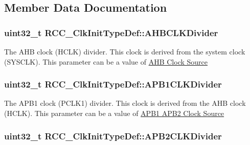 \subsection{Member Data Documentation}
\hypertarget{struct_r_c_c___clk_init_type_def_abd9bcaa8dcf4b816462ee2930ab3e993}{
\subsubsection[{A\-H\-B\-C\-L\-K\-Divider}]{\setlength{\rightskip}{0pt plus 5cm}uint32\-\_\-t R\-C\-C\-\_\-\-Clk\-Init\-Type\-Def\-::\-A\-H\-B\-C\-L\-K\-Divider}}\label{struct_r_c_c___clk_init_type_def_abd9bcaa8dcf4b816462ee2930ab3e993}
The A\-H\-B clock (H\-C\-L\-K) divider. This clock is derived from the system clock (S\-Y\-S\-C\-L\-K). This parameter can be a value of \hyperlink{group___r_c_c___a_h_b___clock___source}{A\-H\-B Clock Source} \hypertarget{struct_r_c_c___clk_init_type_def_a21ceb024102adc3c4dc7eb270cf02ebd}{
\subsubsection[{A\-P\-B1\-C\-L\-K\-Divider}]{\setlength{\rightskip}{0pt plus 5cm}uint32\-\_\-t R\-C\-C\-\_\-\-Clk\-Init\-Type\-Def\-::\-A\-P\-B1\-C\-L\-K\-Divider}}\label{struct_r_c_c___clk_init_type_def_a21ceb024102adc3c4dc7eb270cf02ebd}
The A\-P\-B1 clock (P\-C\-L\-K1) divider. This clock is derived from the A\-H\-B clock (H\-C\-L\-K). This parameter can be a value of \hyperlink{group___r_c_c___a_p_b1___a_p_b2___clock___source}{A\-P\-B1 A\-P\-B2 Clock Source} \hypertarget{struct_r_c_c___clk_init_type_def_aa75c110cd93855d49249f38da8cf94f7}{
\subsubsection[{A\-P\-B2\-C\-L\-K\-Divider}]{\setlength{\rightskip}{0pt plus 5cm}uint32\-\_\-t R\-C\-C\-\_\-\-Clk\-Init\-Type\-Def\-::\-A\-P\-B2\-C\-L\-K\-Divider}}\label{struct_r_c_c___clk_init_type_def_aa75c110cd93855d49249f38da8cf94f7}
